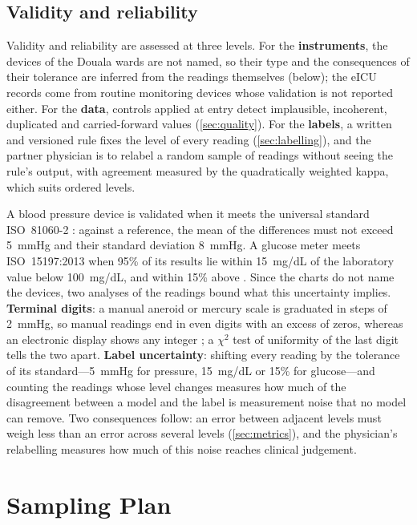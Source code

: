\subsection{Validity and reliability}\label{sec:validity}\label{sec:instruments-obtained}

Validity and reliability are assessed at three levels. For the \textbf{instruments}, the devices of the Douala wards are not named, so their type and the consequences of their tolerance are inferred from the readings themselves (below); the eICU records come from routine monitoring devices whose validation is not reported either. For the \textbf{data}, controls applied at entry detect implausible, incoherent, duplicated and carried-forward values (\cref{sec:quality}). For the \textbf{labels}, a written and versioned rule fixes the level of every reading (\cref{sec:labelling}), and the partner physician is to relabel a random sample of readings without seeing the rule's output, with agreement measured by the quadratically weighted kappa, which suits ordered levels.

A blood pressure device is validated when it meets the universal standard ISO~81060-2 \parencite{stergiou2018,iso81060-2}: against a reference, the mean of the differences must not exceed 5~mmHg and their standard deviation 8~mmHg. A glucose meter meets ISO~15197:2013 when 95\% of its results lie within 15~mg/dL of the laboratory value below 100~mg/dL, and within 15\% above \parencite{iso15197}. Since the charts do not name the devices, two analyses of the readings bound what this uncertainty implies. \textbf{Terminal digits}: a manual aneroid or mercury scale is graduated in steps of 2~mmHg, so manual readings end in even digits with an excess of zeros, whereas an electronic display shows any integer \parencite{kottke2022}; a $\chi^2$ test of uniformity of the last digit tells the two apart. \textbf{Label uncertainty}: shifting every reading by the tolerance of its standard---5~mmHg for pressure, 15~mg/dL or 15\% for glucose---and counting the readings whose level changes measures how much of the disagreement between a model and the label is measurement noise that no model can remove. Two consequences follow: an error between adjacent levels must weigh less than an error across several levels (\cref{sec:metrics}), and the physician's relabelling measures how much of this noise reaches clinical judgement.

\section{Sampling Plan}\label{sec:sampling}\label{sec:capacity}

